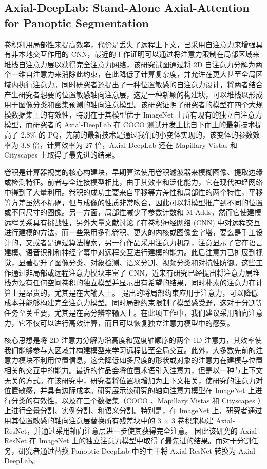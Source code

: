 \subsection{Axial-DeepLab: Stand-Alone Axial-Attention for Panoptic Segmentation}

卷积利用局部性来提高效率，代价是丢失了远程上下文，已采用自注意力来增强具有非本地交互作用的 CNN，最近的工作证明可以通过将注意力限制在局部区域来堆栈自注意力层以获得完全注意力网络，该研究试图通过将 2D 自注意力分解为两个一维自注意力来消除此约束，在此降低了计算复杂度，并允许在更大甚至全局区域内执行注意力。同时研究者还提出了一种位置敏感的自注意力设计，将两者结合产生研究者想要的位置敏感轴向注意层，这是一种新颖的构建块，可以堆栈以形成用于图像分类和密集预测的轴向注意模型。该研究证明了研究者的模型在四个大规模数据集上的有效性，特别在于其模型优于 ImageNet 上所有现有的独立自注意力模型，而研究者的 Axial-DeepLab 在 COCO 测试开发上比自下而上的最新技术提高了 2.8\% 的 PQ，先前的最新技术是通过我们的小变体实现的，该变体的参数效率为 3.8 倍，计算效率为 27 倍，Axial-DeepLab 还在 Mapillary Vistas 和 Cityscapes 上取得了最先进的结果。

卷积是计算器视觉的核心构建块，早期算法使用卷积滤波器来模糊图像、提取边缘或检测特征。前者与全连接模型相比，由于其效率和泛化能力，它在现代神经网络中得到了大量利用。卷积的成功主要来自平移等方差性和局部性的两个特性，平移等方差虽然不精确，但与成像的性质非常吻合，因此可以将模型推广到不同的位置或不同尺寸的图像。另一方面，局部性减少了参数计数和 M-Adds，然而它使建模远程关系具有挑战性，另外大量文献讨论了在卷积神经网络 (CNN) 中对远程交互进行建模的方法，而一些采用多孔卷积、更大的内核或图像金字塔，要么是手工设计的，又或者是通过算法搜索，另一行作品采用注意力机制，注意显示了它在语言建模、语音识别和神经字幕中对远程交互进行建模的能力。此后注意力已扩展到视觉，显著提升了图像分类、对象检测、语义分割、视频分类和对抗性防御。这些工作通过非局部或远程注意力模块丰富了 CNN，近来有研究已经提出将注意力层堆栈为没有任何空间卷积的独立模型并显示出有希望的结果，同时朴素的注意力在计算上是昂贵的，尤其是在大输入上。 提出的将局部约束应用于注意力，可以降低成本并能够构建完全注意力模型。同时局部约束限制了模型感受野，这对于分割等任务至关重要，尤其是在高分辨率输入上。在此项工作中，我们建议采用轴向注意力，它不仅可以进行高效计算，而且可以恢复独立注意力模型中的感受。

核心思想是将 2D 注意力分解为沿高度和宽度轴顺序的两个 1D 注意力，其效率使我们能够参与大区域并构建模型来学习远程甚至全局交互。此外，大多数先前的注意力模块不利用位置信息，这会降低如多尺度的形状或对象的注意力在建模与位置相关的交互中的能力。最近的作品会将位置术语引入注意力，但是以一种与上下文无关的方式。在该研究中，研究者将位置项增加为上下文相关，使研究的注意力对位置敏感，并具有边际成本。研究展示该研究的轴向注意力模型在 ImageNet 上进行分类的有效性，以及在三个数据集（COCO 、Mapillary Vistas 和 Cityscapes ）上进行全景分割、实例分割、和语义分割。特别是，在 ImageNet 上，研究者通过用其位置敏感的轴向注意层替换所有残差块中的 3 × 3 卷积来构建 Axial-ResNet，并通过采用轴向注意层进一步使其获得完全注意。
因此该研究的 Axial-ResNet 在 ImageNet 上的独立注意力模型中取得了最先进的结果。而对于分割任务，研究者通过替换 Panoptic-DeepLab 中的主干将 Axial-ResNet 转换为 Axial-DeepLab。

